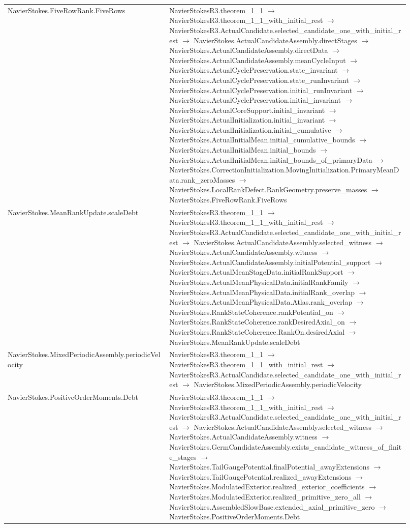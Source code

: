 \begin{longtable}{p{0.37\linewidth}p{0.55\linewidth}}
NavierStokes.FiveRowRank.FiveRows & NavierStokesR3.theorem\_1\_1 $\to$ NavierStokesR3.theorem\_1\_1\_with\_initial\_rest $\to$ NavierStokesR3.ActualCandidate.selected\_candidate\_one\_with\_initial\_rest $\to$ NavierStokes.ActualCandidateAssembly.directStages $\to$ NavierStokes.ActualCandidateAssembly.directData $\to$ NavierStokes.ActualCandidateAssembly.meanCycleInput $\to$ NavierStokes.ActualCyclePreservation.state\_invariant $\to$ NavierStokes.ActualCyclePreservation.state\_runInvariant $\to$ NavierStokes.ActualCyclePreservation.initial\_runInvariant $\to$ NavierStokes.ActualCyclePreservation.initial\_invariant $\to$ NavierStokes.ActualCoreSupport.initial\_invariant $\to$ NavierStokes.ActualInitialization.initial\_invariant $\to$ NavierStokes.ActualInitialization.initial\_cumulative $\to$ NavierStokes.ActualInitialMean.initial\_cumulative\_bounds $\to$ NavierStokes.ActualInitialMean.initial\_bounds $\to$ NavierStokes.ActualInitialMean.initial\_bounds\_of\_primaryData $\to$ NavierStokes.CorrectionInitialization.MovingInitialization.PrimaryMeanData.rank\_zeroMasses $\to$ NavierStokes.LocalRankDefect.RankGeometry.preserve\_masses $\to$ NavierStokes.FiveRowRank.FiveRows\\
NavierStokes.MeanRankUpdate.scaleDebt & NavierStokesR3.theorem\_1\_1 $\to$ NavierStokesR3.theorem\_1\_1\_with\_initial\_rest $\to$ NavierStokesR3.ActualCandidate.selected\_candidate\_one\_with\_initial\_rest $\to$ NavierStokes.ActualCandidateAssembly.selected\_witness $\to$ NavierStokes.ActualCandidateAssembly.witness $\to$ NavierStokes.ActualCandidateAssembly.initialPotential\_support $\to$ NavierStokes.ActualMeanStageData.initialRankSupport $\to$ NavierStokes.ActualMeanPhysicalData.initialRankFamily $\to$ NavierStokes.ActualMeanPhysicalData.initialRank\_overlap $\to$ NavierStokes.ActualMeanPhysicalData.Atlas.rank\_overlap $\to$ NavierStokes.RankStateCoherence.rankPotential\_on $\to$ NavierStokes.RankStateCoherence.rankDesiredAxial\_on $\to$ NavierStokes.RankStateCoherence.RankOn.desiredAxial $\to$ NavierStokes.MeanRankUpdate.scaleDebt\\
NavierStokes.MixedPeriodicAssembly.periodicVelocity & NavierStokesR3.theorem\_1\_1 $\to$ NavierStokesR3.theorem\_1\_1\_with\_initial\_rest $\to$ NavierStokesR3.ActualCandidate.selected\_candidate\_one\_with\_initial\_rest $\to$ NavierStokes.MixedPeriodicAssembly.periodicVelocity\\
NavierStokes.PositiveOrderMoments.Debt & NavierStokesR3.theorem\_1\_1 $\to$ NavierStokesR3.theorem\_1\_1\_with\_initial\_rest $\to$ NavierStokesR3.ActualCandidate.selected\_candidate\_one\_with\_initial\_rest $\to$ NavierStokes.ActualCandidateAssembly.selected\_witness $\to$ NavierStokes.ActualCandidateAssembly.witness $\to$ NavierStokes.GermCandidateAssembly.exists\_candidate\_witness\_of\_finite\_stages $\to$ NavierStokes.TailGaugePotential.finalPotential\_awayExtensions $\to$ NavierStokes.TailGaugePotential.realized\_awayExtensions $\to$ NavierStokes.ModulatedExterior.realized\_exterior\_coefficients $\to$ NavierStokes.ModulatedExterior.realized\_primitive\_zero\_all $\to$ NavierStokes.AssembledSlowBase.extended\_axial\_primitive\_zero $\to$ NavierStokes.PositiveOrderMoments.Debt\\

\end{longtable}

